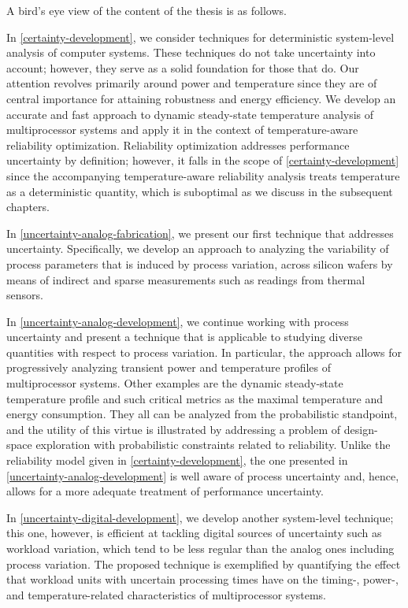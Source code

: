 A bird's eye view of the content of the thesis is as follows.

In \cref{certainty-development}, we consider techniques for deterministic
system-level analysis of computer systems. These techniques do not take
uncertainty into account; however, they serve as a solid foundation for those
that do. Our attention revolves primarily around power and temperature since
they are of central importance for attaining robustness and energy efficiency.
We develop an accurate and fast approach to dynamic steady-state temperature
analysis of multiprocessor systems and apply it in the context of
temperature-aware reliability optimization. Reliability optimization addresses
performance uncertainty by definition; however, it falls in the scope of
\cref{certainty-development} since the accompanying temperature-aware
reliability analysis treats temperature as a deterministic quantity, which is
suboptimal as we discuss in the subsequent chapters.

In \cref{uncertainty-analog-fabrication}, we present our first technique that
addresses uncertainty. Specifically, we develop an approach to analyzing the
variability of process parameters that is induced by process variation, across
silicon wafers by means of indirect and sparse measurements such as readings
from thermal sensors.

In \cref{uncertainty-analog-development}, we continue working with process
uncertainty and present a technique that is applicable to studying diverse
quantities with respect to process variation. In particular, the approach allows
for progressively analyzing transient power and temperature profiles of
multiprocessor systems. Other examples are the dynamic steady-state temperature
profile and such critical metrics as the maximal temperature and energy
consumption. They all can be analyzed from the probabilistic standpoint, and the
utility of this virtue is illustrated by addressing a problem of design-space
exploration with probabilistic constraints related to reliability. Unlike the
reliability model given in \cref{certainty-development}, the one presented in
\cref{uncertainty-analog-development} is well aware of process uncertainty and,
hence, allows for a more adequate treatment of performance uncertainty.

In \cref{uncertainty-digital-development}, we develop another system-level
technique; this one, however, is efficient at tackling digital sources of
uncertainty such as workload variation, which tend to be less regular than the
analog ones including process variation. The proposed technique is exemplified
by quantifying the effect that workload units with uncertain processing times
have on the timing-, power-, and temperature-related characteristics of
multiprocessor systems.

